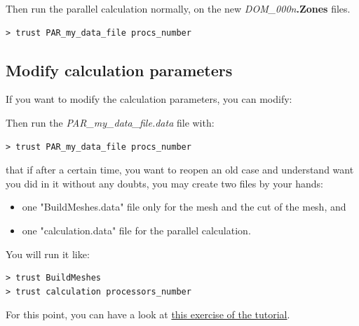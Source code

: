 Then run the parallel calculation normally, on the new \textit{DOM\_000n}\textbf{.Zones} files.
\begin{verbatim}
> trust PAR_my_data_file procs_number
\end{verbatim}




\subsection{Modify calculation parameters}
If you want to modify the calculation parameters, you can modify:
Then run the \textit{PAR\_my\_data\_file.data} file with:
\begin{verbatim}
> trust PAR_my_data_file procs_number
\end{verbatim}

\Note that if after a certain time, you want to reopen an old case and understand want you did in it without any doubts, you may create two files by your hands:
\begin{itemize} 
\item one "BuildMeshes.data" file only for the mesh and the cut of the mesh, and
\item one "calculation.data" file for the parallel calculation. 
\end{itemize}
You will run it like:
\begin{verbatim}
> trust BuildMeshes
> trust calculation processors_number
\end{verbatim}

For this point, you can have a look at \href{TRUST_tutorial.pdf\#prm_para}{this exercise of the \trust tutorial}.





